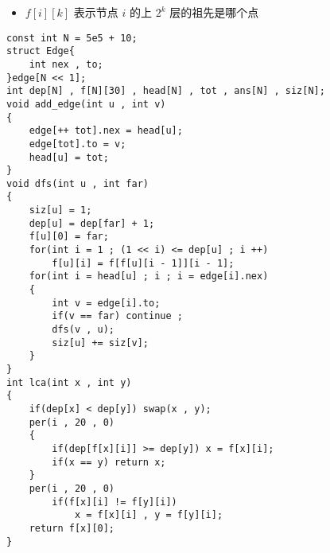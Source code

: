 \documentclass[E:/GsjzTle/main/main.tex]{subfiles}
\begin{document}
\begin{itemize}
\item
  \(f[i][k]\) 表示节点 \(i\) 的上 \(2^k\) 层的祖先是哪个点
\end{itemize}

\begin{lstlisting}
const int N = 5e5 + 10;
struct Edge{
	int nex , to;
}edge[N << 1];
int dep[N] , f[N][30] , head[N] , tot , ans[N] , siz[N];
void add_edge(int u , int v)
{
	edge[++ tot].nex = head[u];
	edge[tot].to = v;
	head[u] = tot;
}
void dfs(int u , int far)
{
	siz[u] = 1;
	dep[u] = dep[far] + 1;
	f[u][0] = far;
	for(int i = 1 ; (1 << i) <= dep[u] ; i ++)	
		f[u][i] = f[f[u][i - 1]][i - 1];
	for(int i = head[u] ; i ; i = edge[i].nex)
	{
		int v = edge[i].to;
		if(v == far) continue ;		
		dfs(v , u);
		siz[u] += siz[v];
	}
} 
int lca(int x , int y)
{
	if(dep[x] < dep[y]) swap(x , y);
	per(i , 20 , 0)
	{
		if(dep[f[x][i]] >= dep[y]) x = f[x][i];
		if(x == y) return x;
	}
	per(i , 20 , 0)
		if(f[x][i] != f[y][i])
			x = f[x][i] , y = f[y][i];
	return f[x][0];
}
\end{lstlisting}
\end{document}
